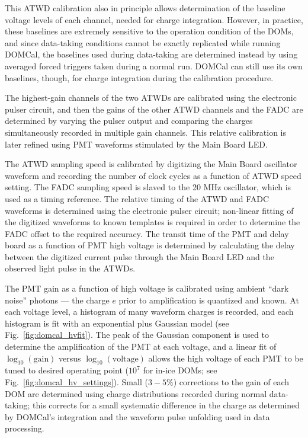 This ATWD calibration also in principle allows determination of the baseline
voltage levels of each channel, needed for charge integration.  However, in
practice, these baselines are extremely sensitive to the operation
condition of the DOMs, and since data-taking conditions cannot be exactly
replicated while running DOMCal, the baselines used during data-taking are
determined instead by using averaged forced triggers taken during a normal
run.  DOMCal can still use its own baselines, though, for charge integration
during the calibration procedure.

The highest-gain channels of the two ATWDs are calibrated using the electronic
pulser circuit, and then the gains of the other ATWD channels and the FADC
are determined by varying the pulser output and comparing the charges
simultaneously recorded in multiple gain channels.  This relative
calibration is later refined using PMT waveforms stimulated by the Main
Board LED.

The ATWD sampling speed is calibrated by digitizing the Main Board oscillator
waveform and recording the number of clock cycles as a function of ATWD
speed setting.  The FADC sampling speed is slaved to the 20 MHz
oscillator, which is used as a timing reference.  The relative timing of
the ATWD and FADC waveforms is determined using the electronic pulser circuit;
non-linear fitting of the digitized waveforms to known templates is
required in order to determine the FADC offset to the required accuracy.
The transit time of the PMT and delay board as a function of PMT high
voltage is determined by calculating the delay between the digitized
current pulse through the Main Board LED and the observed light pulse in
the ATWDs.   

The PMT gain as a function of high voltage is calibrated using ambient
``dark noise'' photons --- the charge $e$ prior to amplification is quantized
and known.  At each voltage level, a histogram of many waveform charges is recorded,
and each histogram is fit with an exponential plus Gaussian model (see
Fig.~\ref{fig:domcal_hvfit}).  The peak of the Gaussian component is used to
determine the amplification of the PMT at each voltage, and a linear fit
of $\log_{10}(\mathrm{gain})$ versus $\log_{10}(\mathrm{voltage})$ allows
the high voltage of each PMT to be tuned to desired operating point ($10^7$
for in-ice DOMs; see Fig.~\ref{fig:domcal_hv_settings}).  Small ($3-5\%$)
corrections to the gain of each DOM are determined using charge
distributions recorded during normal data-taking; this corrects for a small
systematic difference in the charge as determined by DOMCal's integration
and the waveform pulse unfolding used in data processing.


